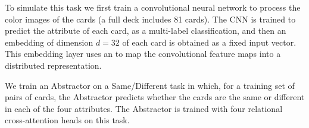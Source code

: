 To simulate this task we first train a convolutional neural network to process the color images 
of the cards (a full deck includes 81 cards). The CNN is trained to predict the attribute of
each card, as a multi-label classification, and then an embedding of dimension $d=32$ of 
each card is obtained as a fixed input vector.
This embedding layer uses an \MLP{} to map the convolutional feature maps into a distributed representation.

 We train an Abstractor on a Same/Different task
in which, for a training set of pairs of cards, the Abstractor predicts whether the cards are
the same or different in each of the four attributes. The Abstractor is trained with 
four relational cross-attention heads on this task.

